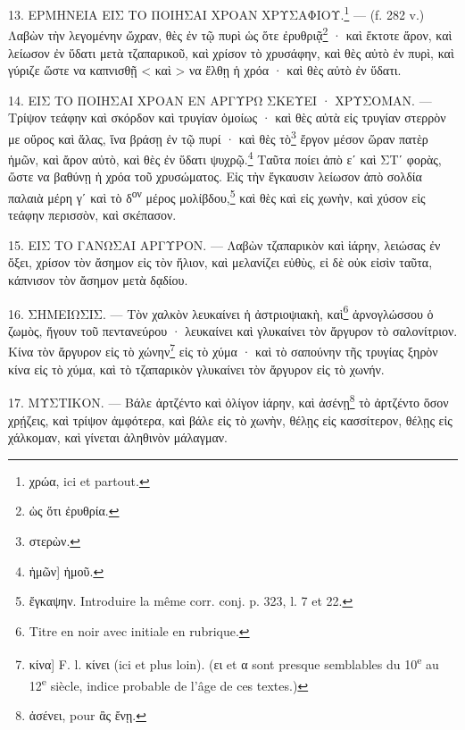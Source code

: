 \documentclass[a4paper, 11pt, oneside, polutonikogreek, french]{article}
\begin{document}
13. ΕΡΜΗΝΕΙΑ ΕΙΣ ΤΟ ΠΟΙΗΣΑΙ ΧΡΟΑΝ ΧΡΥΣΑΦΙΟΥ.\footnote{χρώα, ici et partout.} --- (f. 282 v.) Λαβὼν τὴν λεγομένην ὤχραν, θὲς ἐν τῷ πυρὶ ὡς ὅτε ἐρυθριᾷ\footnote{ὡς ὅτι ἐρυθρία.} · καὶ ἔκτοτε ἄρον, καὶ λείωσον ἐν ὕδατι μετὰ τζαπαρικοῦ, καὶ χρίσον τὸ χρυσάφην, καὶ θὲς αὐτὸ ἐν πυρὶ, καὶ γύριζε ὥστε να καπνισθῇ < καὶ > να ἔλθῃ ἡ χρόα · καὶ θὲς αὐτὸ ἐν ὕδατι.

14. ΕΙΣ ΤΟ ΠΟΙΗΣΑΙ ΧΡΟΑΝ ΕΝ ΑΡΓΥΡΩ ΣΚΕΥΕΙ · ΧΡΥΣΟΜΑΝ. --- Τρίψον τεάφην καὶ σκόρδον καὶ τρυγίαν ὁμοίως · καὶ θὲς αὐτὰ εἰς τρυγίαν στερρὸν με οὔρος καὶ ἅλας, ἵνα βράσῃ ἐν τῷ πυρί · καὶ θὲς τὸ\footnote{στερὼν.} ἔργον μέσον ὥραν πατὲρ ἡμῶν, καὶ ἄρον αὐτὸ, καὶ θὲς ἐν ὕδατι ψυχρῷ.\footnote{ἡμῶν] ἡμοῦ.} Ταῦτα ποίει ἀπὸ εʹ καὶ ΣΤʹ φορὰς, ὥστε να βαθύνῃ ἡ χρόα τοῦ χρυσώματος. Εἰς τὴν ἔγκαυσιν λείωσον ἀπὸ σολδία παλαιὰ μέρη γʹ καὶ τὸ δ\textsuperscript{ον} μέρος μολίβδου,\footnote{ἔγκαψην. Introduire la même corr. conj. p. 323, l. 7 et 22.} καὶ θὲς καὶ εἰς χωνὴν, καὶ χύσον εἰς τεάφην περισσὸν, καὶ σκέπασον.

15. ΕΙΣ ΤΟ ΓΑΝΩΣΑΙ ΑΡΓΥΡΟΝ. --- Λαβὼν τζαπαρικὸν καὶ ἰάρην, λειώσας ἐν ὄξει, χρίσον τὸν ἄσημον εἰς τὸν ἥλιον, καὶ μελανίζει εὐθὺς, εἰ δὲ οὐκ εἰσὶν ταῦτα, κάπνισον τὸν ἄσημον μετὰ δᾳδίου.

16. ΣΗΜΕΙΩΣΙΣ. --- Τὸν χαλκὸν λευκαίνει ἡ ἀστριοψιακὴ, καὶ\footnote{Titre en noir avec initiale en rubrique.} ἀρνογλώσσου ὁ ζωμὸς, ἤγουν τοῦ πεντανεύρου · λευκαίνει καὶ γλυκαίνει τὸν ἄργυρον τὸ σαλονίτριον. Κίνα τὸν ἄργυρον εἰς τὸ χώνην\footnote{κίνα] F. l. κίνει (ici et plus loin). (ει et α sont presque semblables du 10\textsuperscript{e} au 12\textsuperscript{e} siècle, indice probable de l'âge de ces textes.)} εἰς τὸ χύμα · καὶ τὸ σαπούνην τῆς τρυγίας ξηρὸν κίνα εἰς τὸ χύμα, καὶ τὸ τζαπαρικὸν γλυκαίνει τὸν ἄργυρον εἰς τὸ χωνήν.

17. ΜΥΣΤΙΚΟΝ. --- Βάλε ἀρτζέντο καὶ ὀλίγον ἰάρην, καὶ ἀσένῃ\footnote{ἀσένει, pour ἂς ἔνῃ.} τὸ ἀρτζέντο ὅσον χρῄζεις, καὶ τρίψον ἀμφότερα, καὶ βάλε εἰς τὸ χωνὴν, θέλῃς εἰς κασσίτερον, θέλῃς εἰς χάλκομαν, καὶ γίνεται ἀληθινὸν μάλαγμαν.
\end{document}
